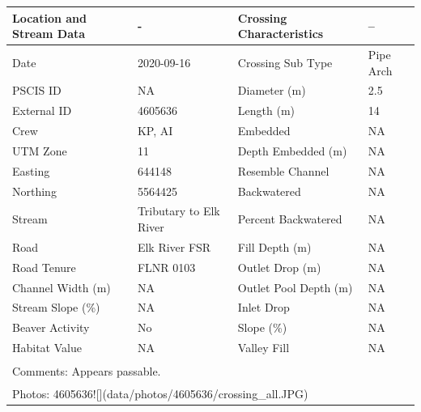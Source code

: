 \documentclass[
]{book}
\begin{document}
\begin{tabular}{l|l|l|l}
\hline
Location and Stream Data & - & Crossing Characteristics & --\\
\hline
Date & 2020-09-16 & Crossing Sub Type & Pipe Arch\\
\hline
PSCIS ID & NA & Diameter (m) & 2.5\\
\hline
External ID & 4605636 & Length (m) & 14\\
\hline
Crew & KP, AI & Embedded & NA\\
\hline
UTM Zone & 11 & Depth Embedded (m) & NA\\
\hline
Easting & 644148 & Resemble Channel & NA\\
\hline
Northing & 5564425 & Backwatered & NA\\
\hline
Stream & Tributary to Elk River & Percent Backwatered & NA\\
\hline
Road & Elk River FSR & Fill Depth (m) & NA\\
\hline
Road Tenure & FLNR 0103 & Outlet Drop (m) & NA\\
\hline
Channel Width (m) & NA & Outlet Pool Depth (m) & NA\\
\hline
Stream Slope (\%) & NA & Inlet Drop & NA\\
\hline
Beaver Activity & No & Slope (\%) & NA\\
\hline
Habitat Value & NA & Valley Fill & NA\\
\hline
\multicolumn{4}{l}{\textsuperscript{} Comments: Appears passable.}\\
\multicolumn{4}{l}{\textsuperscript{} Photos: 4605636![](data/photos/4605636/crossing\_all.JPG)}\\
\end{tabular}
\end{document}
